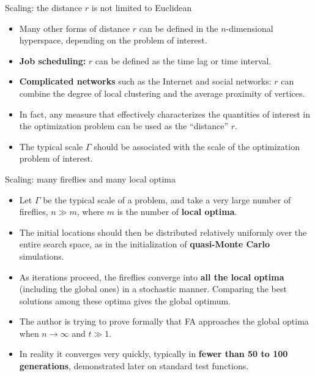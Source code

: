 \documentclass[aspectratio=169,11pt]{beamer}
\newcommand{\hdr}[1]{\gdef\curhdr{#1}}
\gdef\curhdr{}
\begin{document}
\hdr{3 Firefly Algorithm \textperiodcentered{} 3.5 Scaling and Asymptotic Cases}
\begin{frame}[t]{Scaling: the distance $r$ is not limited to Euclidean}
\begin{itemize}\itemsep0.6em
  \item Many other forms of distance $r$ can be defined in the $n$-dimensional hyperspace, depending on the problem of interest.
  \item \textbf{Job scheduling:} $r$ can be defined as the time lag or time interval.
  \item \textbf{Complicated networks} such as the Internet and social networks: $r$ can combine the degree of local clustering and the average proximity of vertices.
  \item In fact, any measure that effectively characterizes the quantities of interest in the optimization problem can be used as the ``distance'' $r$.
  \item The typical scale $\Gamma$ should be associated with the scale of the optimization problem of interest.
\end{itemize}
\end{frame}

\begin{frame}[t]{Scaling: many fireflies and many local optima}
\small
\begin{itemize}\itemsep0.55em
  \item Let $\Gamma$ be the typical scale of a problem, and take a very large number of fireflies, $n\gg m$, where $m$ is the number of \textbf{local optima}.
  \item The initial locations should then be distributed relatively uniformly over the entire search space, as in the initialization of \textbf{quasi-Monte Carlo} simulations.
  \item As iterations proceed, the fireflies converge into \textbf{all the local optima} (including the global ones) in a stochastic manner. Comparing the best solutions among these optima gives the global optimum.
  \item The author is trying to prove formally that FA approaches the global optima when $n\to\infty$ and $t\gg 1$.
  \item In reality it converges very quickly, typically in \textbf{fewer than 50 to 100 generations}, demonstrated later on standard test functions.
\end{itemize}
\end{frame}
\end{document}
